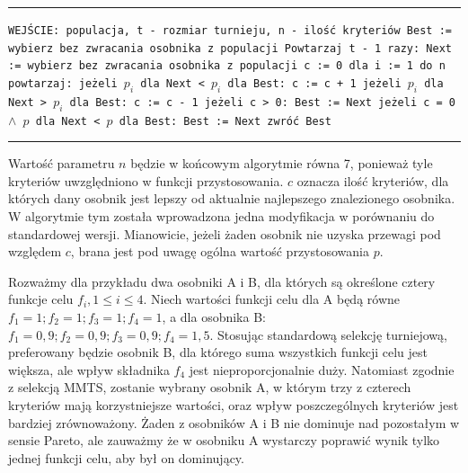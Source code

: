 \documentclass{xmgr}
\begin{document}
\noindent
\rule{380pt}{0.5pt}\newline
\texttt{WEJŚCIE: populacja, t - rozmiar turnieju, n - ilość kryteriów\newline
Best := wybierz bez zwracania osobnika z populacji\newline
Powtarzaj t - 1 razy:\newline
\indent Next := wybierz bez zwracania osobnika z populacji\newline
\indent c := 0\newline
\indent dla i := 1 do n powtarzaj:\newline
\indent\indent jeżeli $p_i$ dla Next < $p_i$ dla Best:\newline
\indent\indent\indent c := c + 1\newline
\indent\indent jeżeli $p_i$ dla Next > $p_i$ dla Best:\newline
\indent\indent\indent c := c - 1\newline
\indent jeżeli c > 0:\newline
\indent\indent Best := Next\newline
\indent jeżeli c = 0 $\wedge$ $p$ dla Next < $p$ dla Best:\newline
\indent\indent Best := Next\newline
zwróć Best\newline
}
\rule{380pt}{0.5pt}\newline

Wartość parametru $n$ będzie w końcowym algorytmie równa 7, ponieważ tyle kryteriów uwzględniono w funkcji przystosowania. $c$ oznacza ilość kryteriów, dla których dany osobnik jest lepszy od aktualnie najlepszego znalezionego osobnika. W algorytmie tym została wprowadzona jedna modyfikacja w porównaniu do standardowej wersji. Mianowicie, jeżeli żaden osobnik nie uzyska przewagi pod względem $c$, brana jest pod uwagę ogólna wartość przystosowania $p$.

Rozważmy dla przykładu dwa osobniki A i B, dla których są określone cztery funkcje celu $f_i, 1 \le i \le 4$. Niech wartości funkcji celu dla A będą równe $f_1 = 1; f_2 = 1; f_3 = 1; f_4 = 1$, a dla osobnika B: $f_1 = 0,9; f_2 = 0,9; f_3 = 0,9; f_4 = 1,5$. Stosując standardową selekcję turniejową, preferowany będzie osobnik B, dla którego suma wszystkich funkcji celu jest większa, ale wpływ składnika $f_4$ jest nieproporcjonalnie duży. Natomiast zgodnie z selekcją MMTS, zostanie wybrany osobnik A, w którym trzy z czterech kryteriów mają korzystniejsze wartości, oraz wpływ poszczególnych kryteriów jest bardziej zrównoważony. Żaden z osobników A i B nie dominuje nad pozostałym w sensie Pareto, ale zauważmy że w osobniku A wystarczy poprawić wynik tylko jednej funkcji celu, aby był on dominujący.
\end{document}
